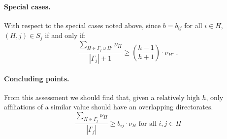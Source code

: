\begin{subappendices}
\paragraph{Special cases.}

With respect to the special cases noted above, since $b = b_{ij}$ for all $i \in H$, $(H,j) \in S_{j}$ if and only if:
\begin{equation}
\frac{\sum_{H \in \Gamma_{j} \cup H'} \nu_{H}}{| \Gamma_{j} | + 1} \geqslant \left( \frac{h - 1}{h + 1} \right) \cdot \nu_{H^{\star}} ~ .
\end{equation}

\paragraph{Concluding points.}

From this assessment we should find that, given a relatively high $h$, only affiliations of a similar value should have an overlapping directorates.
\begin{equation}
\frac{\sum_{H \in \Gamma_{j}} \nu_{H}}{| \Gamma_{j} |} \geqslant b_{ij} \cdot \nu_{H} \mbox{ for all } i,j \in H
\end{equation}

\end{subappendices}
